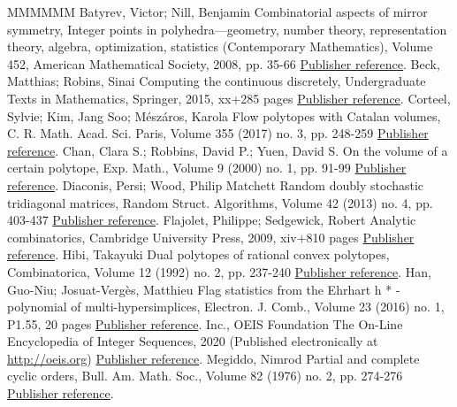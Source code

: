 \begin{thebibliography}{MMMMMM}
 Batyrev, Victor; Nill, Benjamin Combinatorial aspects of mirror symmetry, Integer points in polyhedra—geometry, number theory, representation theory, algebra, optimization, statistics (Contemporary Mathematics), Volume 452, American Mathematical Society, 2008, pp. 35-66 \href{https://ahl.centre-mersenne.org/item/AHL_2020__3__275_0/#BN08}{Publisher reference}.
 Beck, Matthias; Robins, Sinai Computing the continuous discretely, Undergraduate Texts in Mathematics, Springer, 2015, xx+285 pages \href{https://ahl.centre-mersenne.org/item/AHL_2020__3__275_0/#BR15}{Publisher reference}.
 Corteel, Sylvie; Kim, Jang Soo; Mészáros, Karola Flow polytopes with Catalan volumes, C. R. Math. Acad. Sci. Paris, Volume 355 (2017) no. 3, pp. 248-259 \href{https://ahl.centre-mersenne.org/item/AHL_2020__3__275_0/#CKM17}{Publisher reference}.
 Chan, Clara S.; Robbins, David P.; Yuen, David S. On the volume of a certain polytope, Exp. Math., Volume 9 (2000) no. 1, pp. 91-99 \href{https://ahl.centre-mersenne.org/item/AHL_2020__3__275_0/#CRY00}{Publisher reference}.
 Diaconis, Persi; Wood, Philip Matchett Random doubly stochastic tridiagonal matrices, Random Struct. Algorithms, Volume 42 (2013) no. 4, pp. 403-437 \href{https://ahl.centre-mersenne.org/item/AHL_2020__3__275_0/#DW13}{Publisher reference}.
 Flajolet, Philippe; Sedgewick, Robert Analytic combinatorics, Cambridge University Press, 2009, xiv+810 pages \href{https://ahl.centre-mersenne.org/item/AHL_2020__3__275_0/#FS09}{Publisher reference}.
 Hibi, Takayuki Dual polytopes of rational convex polytopes, Combinatorica, Volume 12 (1992) no. 2, pp. 237-240 \href{https://ahl.centre-mersenne.org/item/AHL_2020__3__275_0/#H92}{Publisher reference}.
 Han, Guo-Niu; Josuat-Vergès, Matthieu Flag statistics from the Ehrhart h * -polynomial of multi-hypersimplices, Electron. J. Comb., Volume 23 (2016) no. 1, P1.55, 20 pages \href{https://ahl.centre-mersenne.org/item/AHL_2020__3__275_0/#HJV16}{Publisher reference}.
 Inc., OEIS Foundation The On-Line Encyclopedia of Integer Sequences, 2020 (Published electronically at \url{http://oeis.org}) \href{https://ahl.centre-mersenne.org/item/AHL_2020__3__275_0/#OEIS}{Publisher reference}.
 Megiddo, Nimrod Partial and complete cyclic orders, Bull. Am. Math. Soc., Volume 82 (1976) no. 2, pp. 274-276 \href{https://ahl.centre-mersenne.org/item/AHL_2020__3__275_0/#M76}{Publisher reference}.

\end{thebibliography}
